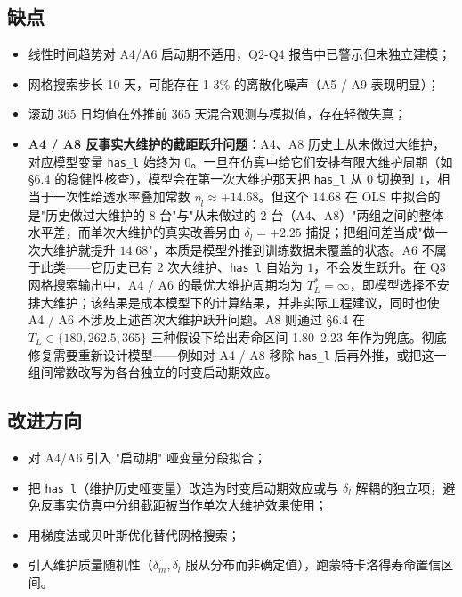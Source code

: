 \documentclass[12pt, a4paper, fontset=fandol]{ctexart}
\theoremstyle{definition}
\begin{document}
\subsection{缺点}
\begin{itemize}[leftmargin=2em]
  \item 线性时间趋势对 A4/A6 启动期不适用，Q2-Q4 报告中已警示但未独立建模；
  \item 网格搜索步长 10 天，可能存在 1-3\% 的离散化噪声（A5 / A9 表现明显）；
  \item 滚动 365 日均值在外推前 365 天混合观测与模拟值，存在轻微失真；
  \item \textbf{A4 / A8 反事实大维护的截距跃升问题}：A4、A8 历史上从未做过大维护，对应模型变量 \texttt{has\_l} 始终为 $0$。一旦在仿真中给它们安排有限大维护周期（如 §6.4 的稳健性核查），模型会在第一次大维护那天把 \texttt{has\_l} 从 $0$ 切换到 $1$，相当于一次性给透水率叠加常数 $\eta_l \approx +14.68$。但这个 $14.68$ 在 OLS 中拟合的是"历史做过大维护的 8 台"与"从未做过的 2 台（A4、A8）"两组之间的整体水平差，而单次大维护的真实改善另由 $\delta_l = +2.25$ 捕捉；把组间差当成"做一次大维护就提升 $14.68$"，本质是模型外推到训练数据未覆盖的状态。A6 不属于此类——它历史已有 2 次大维护、\texttt{has\_l} 自始为 $1$，不会发生跃升。在 Q3 网格搜索输出中，A4 / A6 的最优大维护周期均为 $T_L^*=\infty$，即模型选择不安排大维护；该结果是成本模型下的计算结果，并非实际工程建议，同时也使 A4 / A6 不涉及上述首次大维护跃升问题。A8 则通过 §6.4 在 $T_L \in \{180, 262.5, 365\}$ 三种假设下给出寿命区间 1.80--2.23 年作为兜底。彻底修复需要重新设计模型——例如对 A4 / A8 移除 \texttt{has\_l} 后再外推，或把这一组间常数改写为各台独立的时变启动期效应。
\end{itemize}

\subsection{改进方向}
\begin{itemize}[leftmargin=2em]
  \item 对 A4/A6 引入 "启动期" 哑变量分段拟合；
  \item 把 \texttt{has\_l}（维护历史哑变量）改造为时变启动期效应或与 $\delta_l$ 解耦的独立项，避免反事实仿真中分组截距被当作单次大维护效果使用；
  \item 用梯度法或贝叶斯优化替代网格搜索；
  \item 引入维护质量随机性（$\delta_m, \delta_l$ 服从分布而非确定值），跑蒙特卡洛得寿命置信区间。
\end{itemize}
\end{document}
